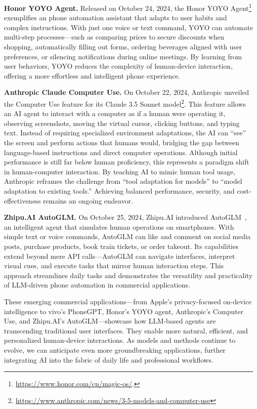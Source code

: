 \noindent\textbf{Honor YOYO Agent.}
Released on October 24, 2024, the Honor YOYO Agent\footnote{\href{https://www.honor.com/cn/magic-os/}{https://www.honor.com/cn/magic-os/}.} exemplifies an phone automation assistant that adapts to user habits and complex instructions. With just one voice or text command, YOYO can automate multi-step processes—such as comparing prices to secure discounts when shopping, automatically filling out forms, ordering beverages aligned with user preferences, or silencing notifications during online meetings. By learning from user behaviors, YOYO reduces the complexity of human-device interaction, offering a more effortless and intelligent phone experience.


\noindent\textbf{Anthropic Claude Computer Use.}
On October 22, 2024, Anthropic unveiled the Computer Use feature for its Claude 3.5 Sonnet model\footnote{\href{https://www.anthropic.com/news/3-5-models-and-computer-use}{https://www.anthropic.com/news/3-5-models-and-computer-use}}. This feature allows an AI agent to interact with a computer as if a human were operating it, observing screenshots, moving the virtual cursor, clicking buttons, and typing text. Instead of requiring specialized environment adaptations, the AI can “see” the screen and perform actions that humans would, bridging the gap between language-based instructions and direct computer operations. Although initial performance is still far below human proficiency, this represents a paradigm shift in human-computer interaction. By teaching AI to mimic human tool usage, Anthropic reframes the challenge from “tool adaptation for models” to “model adaptation to existing tools.” Achieving balanced performance, security, and cost-effectiveness remains an ongoing endeavor.


\noindent\textbf{Zhipu.AI AutoGLM.}
On October 25, 2024, Zhipu.AI introduced AutoGLM~\cite{liu2024autoglm}, an intelligent agent that simulates human operations on smartphones. With simple text or voice commands, AutoGLM can like and comment on social media posts, purchase products, book train tickets, or order takeout. Its capabilities extend beyond mere API calls—AutoGLM can navigate interfaces, interpret visual cues, and execute tasks that mirror human interaction steps. This approach streamlines daily tasks and demonstrates the versatility and practicality of LLM-driven phone automation in commercial applications.


These emerging commercial applications—from Apple’s privacy-focused on-device intelligence to vivo’s PhoneGPT, Honor’s YOYO agent, Anthropic’s Computer Use, and Zhipu.AI’s AutoGLM—showcase how LLM-based agents are transcending traditional user interfaces. They enable more natural, efficient, and personalized human-device interactions. As models and methods continue to evolve, we can anticipate even more groundbreaking applications, further integrating AI into the fabric of daily life and professional workflows.
